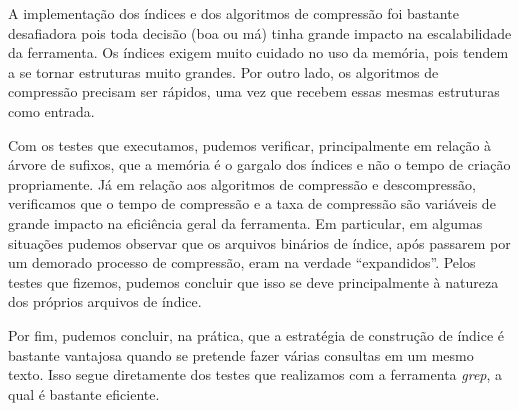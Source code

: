 \documentclass[]{article}
\begin{document}
A implementação dos índices e dos algoritmos de compressão foi bastante desafiadora pois toda decisão (boa ou má) tinha grande impacto na escalabilidade da ferramenta. Os índices exigem muito cuidado no uso da memória, pois tendem a se tornar estruturas muito grandes. Por outro lado, os algoritmos de compressão precisam ser rápidos, uma vez que recebem essas mesmas estruturas como entrada.

Com os testes que executamos, pudemos verificar, principalmente em relação à árvore de sufixos, que a memória é o gargalo dos índices e não o tempo de criação propriamente. Já em relação aos algoritmos de compressão e descompressão, verificamos que o tempo de compressão e a taxa de compressão são variáveis de grande impacto na eficiência geral da ferramenta. Em particular, em algumas situações pudemos observar que os arquivos binários de índice, após passarem por um demorado processo de compressão, eram na verdade ``expandidos''. Pelos testes que fizemos, pudemos concluir que isso se deve principalmente à natureza dos próprios arquivos de índice.

Por fim, pudemos concluir, na prática, que a estratégia de construção de índice é bastante vantajosa quando se pretende fazer várias consultas em um mesmo texto. Isso segue diretamente dos testes que realizamos com a ferramenta \textit{grep}, a qual é bastante eficiente.
\end{document}
